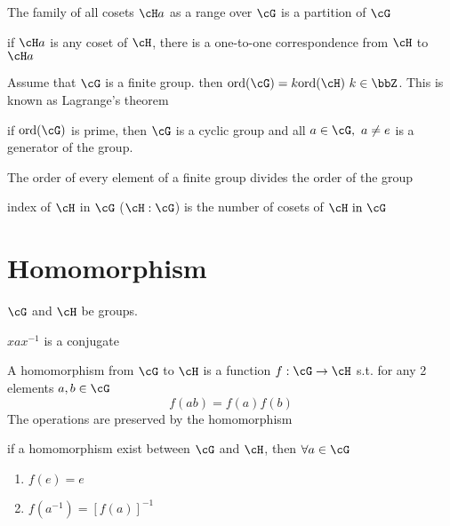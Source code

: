 \documentclass[11pt, oneside, dvipdfmx]{book}
\begin{document}
	\begin{MyTheorem}
	The family of all cosets $\cH a$ as a range over $\cG$ is a partition of $\cG$
	\end{MyTheorem}
	
	\begin{MyTheorem}
	if $\cH a$ is any coset of $\cH$, there is a one-to-one correspondence from $\cH$ to $\cH a$
	\end{MyTheorem}
	
	\begin{MyTheorem}
	Assume that $\cG$ is a finite group.  then $\text{ord}(\cG)=k\text{ord}(\cH)~k \in \bbZ$. This is known as Lagrange's theorem
	\end{MyTheorem}
	
	\begin{MyTheorem}
	if $\text{ord}(\cG)$ is prime, then $\cG$ is a cyclic group and all $a \in \cG, ~ a \neq e$ is a generator of the group.
	\end{MyTheorem}
	
	\begin{MyTheorem}
	The order of every element of a finite group divides the order of the group
	\end{MyTheorem}
	
	\begin{description}
	\item index of $\cH$ in $\cG$ ($\cH : \cG$) is the number of cosets of $\cH ~\text{in} ~\cG$
	\end{description}
	
	\section{Homomorphism}
	\begin{description}
	\item $\cG$ and $\cH$ be groups. 
	\item $xax^{-1}$ is a conjugate
	\end{description}
	
	\begin{MyDefinition}{}
	A homomorphism from $\cG$ to $\cH$ is a function $f: \cG \rightarrow \cH$ s.t. for any 2 elements $a,b \in \cG$ $$f(ab) = f(a)f(b)$$ The operations are preserved by the homomorphism
	\end{MyDefinition}
	
	\begin{MyTheorem}
	if a homomorphism exist between $\cG$ and $\cH$, then $\forall a \in \cG$
	\begin{enumerate}
	\item $f(e) = e$
	\item $f(a^{-1}) = [f(a)]^{-1}$
	\end{enumerate}
	\end{MyTheorem}
\end{document}
